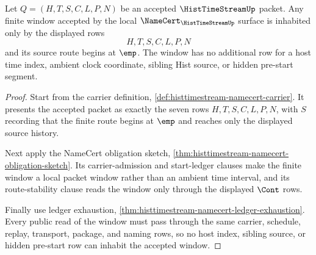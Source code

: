 \begin{theorem}
\label{thm:hist-time-stream-window-habitation}
Let $Q=(H,T,S,C,L,P,N)$ be an accepted $\HistTimeStreamUp$ packet. Any finite window accepted by the local $\NameCert_{\HistTimeStreamUp}$ surface is inhabited only by the displayed rows
$$
H,T,S,C,L,P,N
$$
and its source route begins at $\emp$. The window has no additional row for a host time index, ambient clock coordinate, sibling Hist source, or hidden pre-start segment.
\end{theorem}
\begin{proof}
Start from the carrier definition, \autoref{def:histtimestream-namecert-carrier}. It presents the accepted packet as exactly the seven rows $H,T,S,C,L,P,N$, with $S$ recording that the finite route begins at $\emp$ and reaches only the displayed source history.

Next apply the NameCert obligation sketch, \autoref{thm:histtimestream-namecert-obligation-sketch}. Its carrier-admission and start-ledger clauses make the finite window a local packet window rather than an ambient time interval, and its route-stability clause reads the window only through the displayed $\Cont$ rows.

Finally use ledger exhaustion, \autoref{thm:histtimestream-namecert-ledger-exhaustion}. Every public read of the window must pass through the same carrier, schedule, replay, transport, package, and naming rows, so no host index, sibling source, or hidden pre-start row can inhabit the accepted window.
\end{proof}

